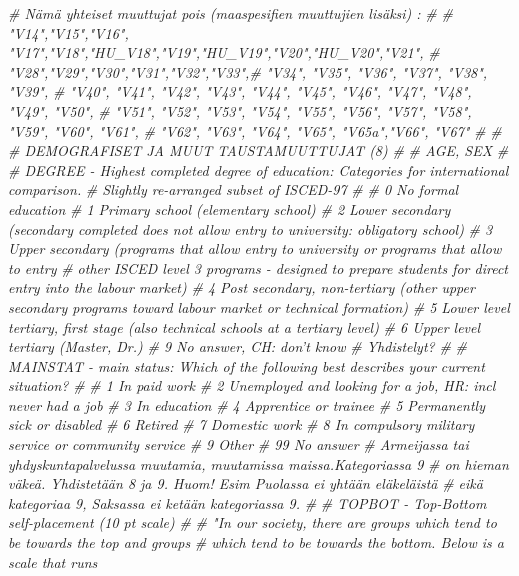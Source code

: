 \documentclass[
  finnish,
]{book}
\newenvironment{Shaded}{\begin{snugshade}}{\end{snugshade}}
\newcommand{\CommentTok}[1]{\textcolor[rgb]{0.56,0.35,0.01}{\textit{#1}}}
\begin{document}
\begin{Shaded}
\begin{Highlighting}[]
{\CommentTok{# Nämä yhteiset muuttujat pois (maaspesifien muuttujien lisäksi) :}
\CommentTok{#}
\CommentTok{# "V14","V15","V16",  "V17","V18","HU_V18","V19","HU_V19","V20","HU_V20","V21",}
\CommentTok{# "V28","V29","V30","V31","V32","V33",# "V34", "V35", "V36", "V37", "V38", "V39",}
\CommentTok{# "V40", "V41", "V42", "V43", "V44", "V45", "V46", "V47", "V48", "V49", "V50", }
\CommentTok{# "V51", "V52", "V53", "V54", "V55", "V56", "V57", "V58", "V59", "V60", "V61", }
\CommentTok{# "V62", "V63", "V64", "V65", "V65a","V66", "V67"}
\CommentTok{#}
\CommentTok{#}
\CommentTok{# DEMOGRAFISET JA MUUT TAUSTAMUUTTUJAT (8)}
\CommentTok{#}
\CommentTok{# AGE, SEX}
\CommentTok{#}
\CommentTok{# DEGREE - Highest completed degree of education: Categories for international comparison. }
\CommentTok{# Slightly re-arranged subset of ISCED-97}
\CommentTok{#}
\CommentTok{# 0 No formal education}
\CommentTok{# 1 Primary school (elementary school)}
\CommentTok{# 2 Lower secondary (secondary completed does not allow entry to university: obligatory school)}
\CommentTok{# 3 Upper secondary (programs that allow entry to university or programs that allow to entry }
\CommentTok{#   other ISCED level 3 programs - designed to prepare students for direct entry into the labour market)}
\CommentTok{# 4 Post secondary, non-tertiary (other upper secondary programs toward labour market or technical formation)}
\CommentTok{# 5 Lower level tertiary, first stage (also technical schools at a tertiary level)}
\CommentTok{# 6 Upper level tertiary (Master, Dr.)}
\CommentTok{# 9 No answer, CH: don't know}
\CommentTok{# Yhdistelyt?}
\CommentTok{#}
\CommentTok{# MAINSTAT - main status: Which of the following best describes your current situation?}
\CommentTok{#}
\CommentTok{# 1 In paid work}
\CommentTok{# 2 Unemployed and looking for a job, HR: incl never had a job}
\CommentTok{# 3 In education}
\CommentTok{# 4 Apprentice or trainee}
\CommentTok{# 5 Permanently sick or disabled}
\CommentTok{# 6 Retired}
\CommentTok{# 7 Domestic work}
\CommentTok{# 8 In compulsory military service or community service}
\CommentTok{# 9 Other}
\CommentTok{# 99 No answer}
\CommentTok{# Armeijassa tai yhdyskuntapalvelussa muutamia, muutamissa maissa.Kategoriassa 9 }
\CommentTok{# on hieman väkeä. Yhdistetään 8 ja 9. Huom! Esim Puolassa ei yhtään eläkeläistä}
\CommentTok{# eikä kategoriaa 9, Saksassa ei ketään kategoriassa 9.}
\CommentTok{#}
\CommentTok{# TOPBOT - Top-Bottom self-placement (10 pt scale)}
\CommentTok{#}
\CommentTok{# "In our society, there are groups which tend to be towards the top and groups }
\CommentTok{# which tend to be towards the bottom. Below is a scale that runs}
}
\end{Highlighting}
\end{Shaded}
\end{document}
